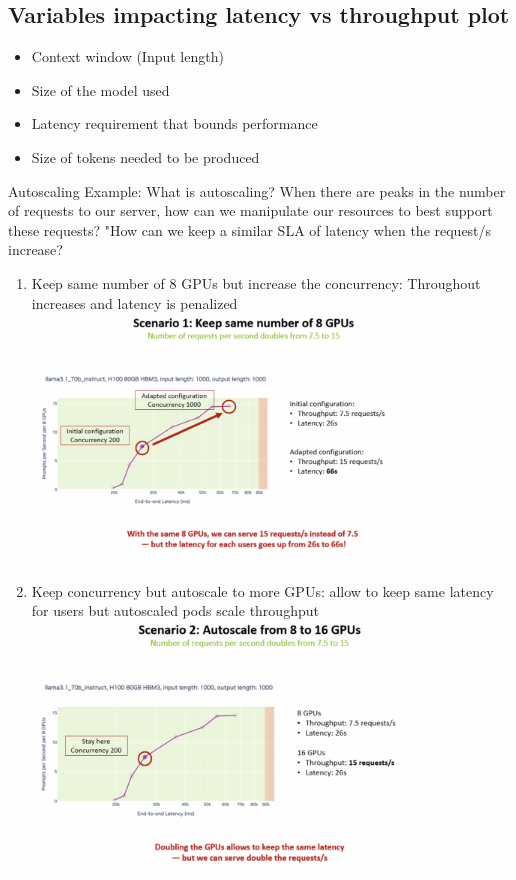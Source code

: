 \documentclass{article}
\begin{document}
\subsection{Variables impacting latency vs throughput plot}
\begin{itemize}
    \item Context window (Input length)
    \item Size of the model used
    \item Latency requirement that bounds performance
    \item Size of tokens needed to be produced
\end{itemize}
Autoscaling Example:
What is autoscaling? When there are peaks in the number of requests to our server, how can we manipulate our resources to best support these requests? "How can we keep a similar SLA of latency when the request/s increase?
\begin{enumerate}
    \item Keep same number of 8 GPUs but increase the concurrency: Throughout increases and latency is penalized \\\includegraphics[width=0.8\textwidth]{../images/scenario1.png}
    \item Keep concurrency but autoscale to more GPUs: allow to keep same latency for users but autoscaled pods scale throughput\\\includegraphics[width=0.8\textwidth]{../images/scenario2.png}
\end{enumerate}
\end{document}
